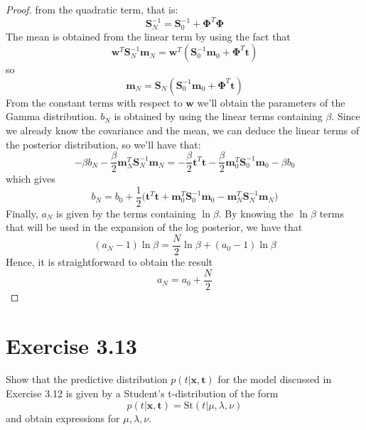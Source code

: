 \begin{proof}
    from the quadratic term, that is:
    \begin{equation}\label{eq:3.51*}\tag{3.51*}
         \mathbf{S}_N^{-1} = \mathbf{S}_0^{-1} + \mathbf{\Phi}^T\mathbf{\Phi}
    \end{equation}
    The mean is obtained from the linear term by using the fact that
    \[
        \mathbf{w}^T \mathbf{S}_N^{-1} \mathbf{m}_N
        = \mathbf{w}^T(\mathbf{S}_0^{-1} \mathbf{m}_0 + \mathbf{\Phi}^T \mathbf{t})
    \] 
    so 
    \begin{equation}\label{eq:3.50*}\tag{3.50*}
        \mathbf{m}_N = \mathbf{S}_N 
            (\mathbf{S}_0^{-1} \mathbf{m}_0 + \mathbf{\Phi}^T \mathbf{t})
    \end{equation}
    From the constant terms with respect to $\mathbf{w}$ we'll obtain the
    parameters of the Gamma distribution. $b_N$ is obtained by using the 
    linear terms containing  $\beta$. Since we already know the covariance and the 
    mean, we can deduce the linear terms of the posterior distribution, so we'll have
    that:
    \[
        - \beta b_N
        -\frac{\beta}{2} \mathbf{m}_N^T \mathbf{S}_N^{-1} \mathbf{m}_N
        = -\frac{\beta}{2} \mathbf{t}^T\mathbf{t} 
        -\frac{\beta}{2} \mathbf{m}_0^T \mathbf{S}_0^{-1} \mathbf{m}_0
        -\beta b_0
    \]
    which gives
    \begin{equation}\label{eq:3.12.1}\tag{3.12.1}
        b_N 
        = b_0 + \frac{1}{2} \big(
            \mathbf{t}^T\mathbf{t} + \mathbf{m}_0^T\mathbf{S}_0^{-1}\mathbf{m}_0
            - \mathbf{m}_N^T\mathbf{S}_N^{-1}\mathbf{m}_N\big)
    \end{equation}
    Finally, $a_N$ is given by the terms containing $\ln \beta$. 
    By knowing the $\ln \beta$ terms that will be used in the expansion of the 
    log posterior, we have that
    \[
        (a_N - 1) \ln \beta = \frac{N}{2} \ln \beta + (a_0 - 1) \ln \beta
    \] 
    Hence, it is straightforward to obtain the result
    \begin{equation}\label{eq:2.150}\tag{2.150}
        a_N = a_0 + \frac{N}{2}
    \end{equation}
\end{proof}

\section*{Exercise 3.13}
Show that the predictive distribution $p(t | \mathbf{x}, \mathbf{t})$ for the 
model discussed in Exercise 3.12 is given by a Student's t-distribution of
the form
\begin{equation}\label{eq:3.114}\tag{3.114}
    p(t | \mathbf{x}, \mathbf{t}) = \text{St}(t | \mu, \lambda, \nu)
\end{equation}
and obtain expressions for $\mu, \lambda, \nu$.

